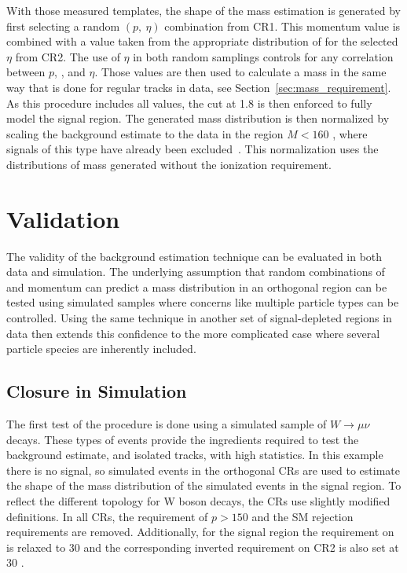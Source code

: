 With those measured templates, the shape of the mass estimation is generated by first selecting a random $(p,\ \eta)$ combination from CR1. 
This momentum value is combined with a \dedx value taken from the appropriate distribution of \dedx for the selected $\eta$ from CR2. 
The use of $\eta$ in both random samplings controls for any correlation between $p$, \dedx, and $\eta$. 
Those values are then used to calculate a mass in the same way that is done for regular tracks in data, see Section~\ref{sec:mass_requirement}.
As this procedure includes all \dedx values, the cut at 1.8 \MeVgcm is then enforced to fully model the signal region.
The generated mass distribution is then normalized by scaling the background estimate to the data in the region $M < 160$ \GeV, where signals of this type have already been excluded~\cite{SUSY-2014-09}.
This normalization uses the distributions of mass generated without the ionization requirement.


\section{Validation}

The validity of the background estimation technique can be evaluated in both data and simulation.
The underlying assumption that random combinations of \dedx and momentum can predict a mass distribution in an orthogonal region can be tested using simulated samples where concerns like multiple particle types can be controlled.
Using the same technique in another set of signal-depleted regions in data then extends this confidence to the more complicated case where several particle species are inherently included.

\subsection{Closure in Simulation}
The first test of the procedure is done using a simulated sample of $W\rightarrow\mu\nu$ decays.
These types of events provide the ingredients required to test the background estimate, \met and isolated tracks, with high statistics.
In this example there is no signal, so simulated events in the orthogonal \acp{CR} are used to estimate the shape of the mass distribution of the simulated events in the signal region.
To reflect the different topology for W boson decays, the \acp{CR} use slightly modified definitions.
In all \acp{CR}, the requirement of $p > 150$ \GeV and the \ac{SM} rejection requirements are removed.
Additionally, for the signal region the requirement on \met is relaxed to 30 \GeV and the corresponding inverted requirement on CR2 is also set at 30 \GeV.

